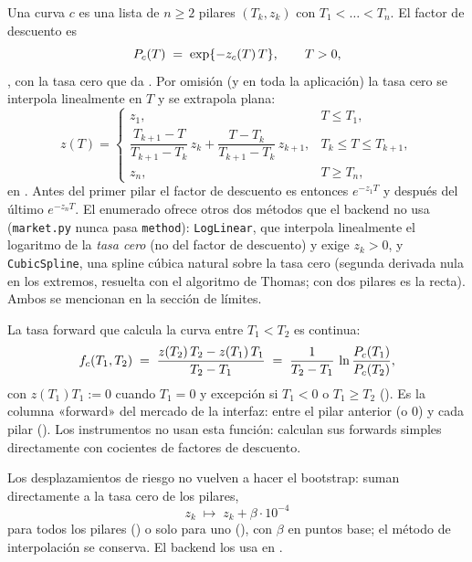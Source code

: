 Una curva $c$ es una lista de $n\ge 2$ pilares $(T_k,z_k)$ con $T_1<\dots<T_n$. El factor de descuento es
\begin{equation}\label{eq:cap02-df}
  P_{c}(T) \;=\; \exp\{-z_c(T)\,T\}, \qquad T>0,
\end{equation}
, con la tasa cero que da
. Por omisión (y en toda la aplicación) la tasa cero
se interpola linealmente en $T$ y se extrapola plana:
\begin{equation}\label{eq:cap02-lineal}
  z(T) = \begin{cases}
    z_1, & T \le T_1,\\[2pt]
    \dfrac{T_{k+1}-T}{T_{k+1}-T_k}\,z_k + \dfrac{T-T_k}{T_{k+1}-T_k}\,z_{k+1}, & T_k \le T \le T_{k+1},\\[8pt]
    z_n, & T \ge T_n,
  \end{cases}
\end{equation}
en . Antes del primer pilar el factor de descuento es
entonces $e^{-z_1T}$ y después del último $e^{-z_nT}$. El enumerado
 ofrece otros dos métodos que el backend no usa
(\texttt{market.py} nunca pasa \texttt{method}): \texttt{LogLinear}, que interpola linealmente el logaritmo de la
\emph{tasa cero} (no del factor de descuento) y exige $z_k>0$, y \texttt{CubicSpline}, una spline cúbica natural
sobre la tasa cero (segunda derivada nula en los extremos, resuelta con el algoritmo de Thomas; con dos pilares es
la recta). Ambos se mencionan en la sección de límites.

La tasa forward que calcula la curva entre $T_1<T_2$ es continua:
\begin{equation}\label{eq:cap02-forward}
  f_c(T_1,T_2) \;=\; \frac{z(T_2)\,T_2 - z(T_1)\,T_1}{T_2-T_1}
  \;=\; \frac{1}{T_2-T_1}\,\ln\frac{P_{c}(T_1)}{P_{c}(T_2)},
\end{equation}
con $z(T_1)T_1 := 0$ cuando $T_1=0$ y excepción si $T_1<0$ o $T_1\ge T_2$
(). Es la columna «forward» del mercado de la
interfaz: entre el pilar anterior (o $0$) y cada pilar
(). Los instrumentos no usan esta función: calculan sus forwards simples
directamente con cocientes de factores de descuento.

Los desplazamientos de riesgo no vuelven a hacer el bootstrap: suman directamente a la tasa cero de los pilares,
\begin{equation}\label{eq:cap02-bump}
  z_k \;\longmapsto\; z_k + \beta\cdot 10^{-4}
\end{equation}
para todos los pilares () o solo para uno
(), con $\beta$ en puntos base; el método de
interpolación se conserva. El backend los usa en .

